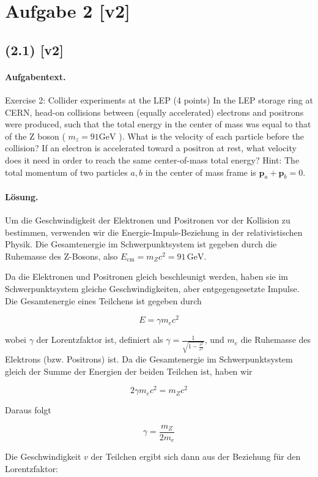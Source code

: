 \documentclass[11pt,a4paper]{article}
\begin{document}
\section*{Aufgabe 2 [v2]}
\subsection*{(2.1) [v2]}
\paragraph{Aufgabentext.}
Exercise 2: Collider experiments at the LEP (4 points)
In the LEP storage ring at CERN, head-on collisions between (equally accelerated) electrons and positrons were produced, such that the total energy in the center of mass was equal to that of the Z boson ( $m_z=91 \mathrm{GeV}$ ). What is the velocity of each particle before the collision? If an electron is accelerated toward a positron at rest, what velocity does it need in order to reach the same center-of-mass total energy?
Hint: The total momentum of two particles $a, b$ in the center of mass frame is $\mathbf{p}_a+\mathbf{p}_b=0$.

\paragraph{Lösung.}
Um die Geschwindigkeit der Elektronen und Positronen vor der Kollision zu bestimmen, verwenden wir die Energie-Impuls-Beziehung in der relativistischen Physik. Die Gesamtenergie im Schwerpunktsystem ist gegeben durch die Ruhemasse des Z-Bosons, also \( E_{\text{cm}} = m_Z c^2 = 91 \, \text{GeV} \).

Da die Elektronen und Positronen gleich beschleunigt werden, haben sie im Schwerpunktsystem gleiche Geschwindigkeiten, aber entgegengesetzte Impulse. Die Gesamtenergie eines Teilchens ist gegeben durch

\[
E = \gamma m_e c^2
\]

wobei \(\gamma\) der Lorentzfaktor ist, definiert als \(\gamma = \frac{1}{\sqrt{1 - \frac{v^2}{c^2}}}\), und \(m_e\) die Ruhemasse des Elektrons (bzw. Positrons) ist. Da die Gesamtenergie im Schwerpunktsystem gleich der Summe der Energien der beiden Teilchen ist, haben wir

\[
2 \gamma m_e c^2 = m_Z c^2
\]

Daraus folgt

\[
\gamma = \frac{m_Z}{2 m_e}
\]

Die Geschwindigkeit \(v\) der Teilchen ergibt sich dann aus der Beziehung für den Lorentzfaktor:
\end{document}
